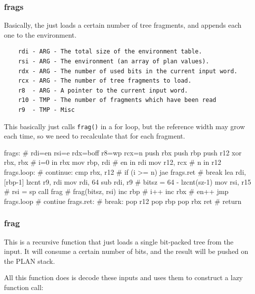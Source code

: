 \subsubsection{frags}

Basically, the just loads a certain number of tree fragments, and
appends each one to the environment.

\begin{verbatim}
    rdi - ARG - The total size of the environment table.
    rsi - ARG - The environment (an array of plan values).
    rdx - ARG - The number of used bits in the current input word.
    rcx - ARG - The number of tree fragments to load.
    r8  - ARG - A pointer to the current input word.
    r10 - TMP - The number of fragments which have been read
    r9  - TMP - Misc
\end{verbatim}

This basically just calls \lstinline|frag()| in a for loop, but the
reference width may grow each time, so we need to recalculate that for
each fragment.

\begin{asm}
frags:                                      # rdi=en rsi=e rdx=boff r8=wp rcx=n
	push	rbx
	push	rbp
	push	r12
	xor	rbx, rbx                    #   i=0 in rbx
	mov	rbp, rdi                    #   en in rdi
	mov	r12, rcx                    #   n in r12
frags.loop:                                 # continue:
	cmp	rbx, r12                    #   if (i >= n)
	jae	frags.ret                   #     break
	lea	rdi, [rbp-1]
	lzcnt	r9, rdi
	mov	rdi, 64
	sub	rdi, r9                     #   bitsz = 64 - lzcnt(sz-1)
	mov	rsi, r15                    #   rsi = sp
	call	frag                        #   frag(bitsz, rsi)
	inc	rbp                         #   i++
	inc	rbx                         #   en++
	jmp	frags.loop                  #   contiue
frags.ret:                                  # break:
	pop	r12
	pop	rbp
	pop	rbx
	ret                                 #   return
\end{asm}

\subsubsection{frag}

This is a recursive function that just loads a single bit-packed tree
from the input. It will consume a certain number of bits, and the result
will be pushed on the PLAN stack.

All this function does is decode these inputs and uses them to construct
a lazy function call:

